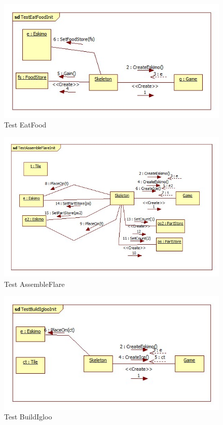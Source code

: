 \begin{figure}[H]
	\begin{center}
		\includegraphics[width=17cm]{chapters/chapter05/diagrams/Test_EatFood_init.jpg}
		\caption{Test EatFood}
		\label{fig:Test EatFood}
	\end{center}
\end{figure}
\begin{figure}[H]
	\begin{center}
		\includegraphics[width=17cm]{chapters/chapter05/diagrams/Test_AssembleFlare_init.jpg}
		\caption{Test AssembleFlare}
		\label{fig:Test AssembleFlare}
	\end{center}
\end{figure}

\begin{figure}[H]
	\begin{center}
		\includegraphics[width=17cm]{chapters/chapter05/diagrams/Test_BuildIgloo_init.jpg}
		\caption{Test BuildIgloo}
		\label{fig:Test BuildIgloo}
	\end{center}
\end{figure}

